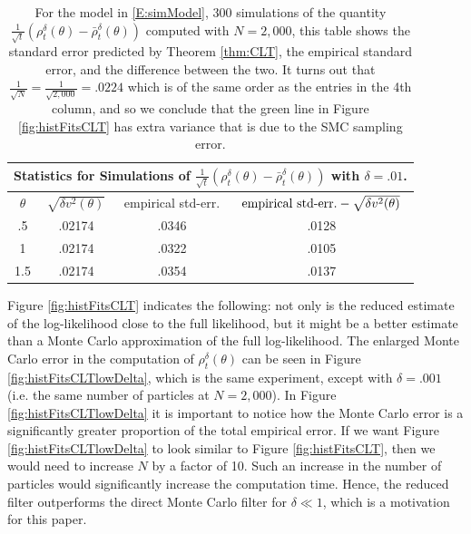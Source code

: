 \documentclass{article}
\begin{document}
\begin{table}
\centering
\begin{tabular}{|c|c|c|c|}
\multicolumn{4}{c}{Statistics for Simulations of  $\frac{1}{\sqrt t}\left(\rho_t^\delta(\theta)-\bar\rho_t^\delta(\theta)\right)$ with $\delta=.01$.}\\
\hline
$\theta$&$\sqrt{\delta v^2(\theta)}$&empirical std-err.&$\hbox{empirical std-err.}-\sqrt{\delta v^2(\theta)}$\\
\hline
.5&.02174&.0346&.0128\\
1&.02174&.0322&.0105\\
1.5&.02174&.0354&.0137\\
\hline
\end{tabular}
\vspace{.2cm}
\caption{For the model in \eqref{E:simModel}, 300 simulations of the quantity $\frac{1}{\sqrt t}\left(\rho_t^\delta(\theta)-\bar\rho_t^\delta(\theta)\right)$ computed with $N=2,000$, this table shows the standard error predicted by Theorem \ref{thm:CLT}, the empirical standard error, and the difference between the two. It turns out that $\frac{1}{\sqrt N} = \frac{1}{\sqrt{2,000}}=.0224$ which is of the same order as the entries in the 4th column, and so we conclude that the green line in Figure \ref{fig:histFitsCLT} has extra variance that is due to the SMC sampling error.}
\label{T:CLTvar}
\end{table}

Figure \ref{fig:histFitsCLT} indicates the following: not only is the reduced estimate of the log-likelihood close to the full likelihood,
but it might be a better estimate than a Monte Carlo approximation of the full log-likelihood. The enlarged Monte Carlo error in the computation of $\rho^{\delta}_{t}(\theta)$
can be seen in Figure \ref{fig:histFitsCLTlowDelta}, which is the same experiment, except with $\delta = .001$ (i.e. the same number of particles at $N=2,000$). In Figure \ref{fig:histFitsCLTlowDelta} it is important to notice how the Monte Carlo error is a significantly greater proportion of the total empirical error. If we want Figure \ref{fig:histFitsCLTlowDelta} to look similar to Figure \ref{fig:histFitsCLT}, then we would need to increase  $N$ by a factor of 10. Such an increase in the number of particles would significantly increase the computation time. Hence, the reduced filter outperforms the direct Monte Carlo filter for $\delta\ll1$, which is a motivation for this paper.
\end{document}
